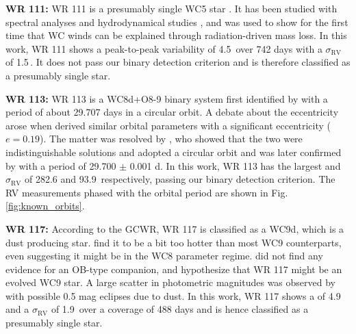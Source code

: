 
\textbf{WR 111:} WR 111 is a presumably single WC5 star \citep{1999aNiemela,2001vanderHucht}. It has been studied with spectral analyses and hydrodynamical studies \citep{2002Grafener,2005GrafenerHamann,2012Sander}, and was used to show for the first time that WC winds can be explained through radiation-driven mass loss. In this work, WR 111 shows a peak-to-peak variability of 4.5\,\kms{} over 742 days with a $\sigma_\textrm{RV}$ of 1.5\,\kms{}. It does not pass our binary detection criterion and is therefore classified as a presumably single star.


\textbf{WR 113:} WR 113 is a WC8d+O8-9 binary system first identified by \citet{1981MasseyNiemela} with a period of about 29.707 days in a circular orbit. A debate about the eccentricity arose when \citet{1996Niemela} derived similar orbital parameters with a significant eccentricity ($e=0.19$). The matter was resolved by \citet{2012David-Uraz}, who showed that the two were indistinguishable solutions and adopted a circular orbit and was later confirmed by \citet{2018Hill} with a period of 29.700 $\pm$ 0.001 d. In this work, WR 113 has the largest \DelRV{} and $\sigma_\textrm{RV}$ of 282.6 and 93.9\,\kms{} respectively, passing our binary detection criterion. The RV measurements phased with the orbital period are shown in Fig. \ref{fig:known_orbits}. 


\textbf{WR 117:} According to the GCWR, WR 117 is classified as a WC9d, which is a dust producing star. \citet{2012Sander} find it to be a bit too hotter than most WC9 counterparts, even suggesting it might be in the WC8 parameter regime. \citet{2005Williams} did not find any evidence for an OB-type companion, and hypothesize that WR 117 might be an evolved WC9 star. A large scatter in photometric magnitudes was observed by \citet{2014Williams} with possible 0.5 mag eclipses due to dust. In this work, WR 117 shows a \DelRV{} of 4.9\,\kms{} and a $\sigma_\textrm{RV}$ of 1.9\,\kms{} over a coverage of 488 days and is hence classified as a presumably single star.

